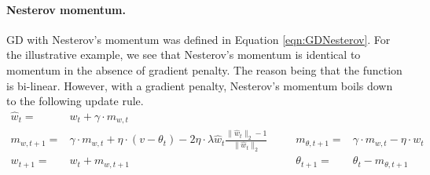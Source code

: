 \paragraph{Nesterov momentum.} GD with Nesterov's momentum was defined in Equation \eqref{eqn:GDNesterov}. For the illustrative example, we see that Nesterov's momentum is identical to momentum in the absence of gradient penalty. The reason being that the function is bi-linear. However, with a gradient penalty, Nesterov's momentum boils down to the following update rule. 
\begin{equation}
\begin{aligned}
\hat{w}_t =& w_t + \gamma\cdot m_{w,t}
~~~~&~~~~ &\\
m_{w, t+1} =& \gamma\cdot m_{w, t} + \eta\cdot (v-\theta_{t}) - 2 \eta\cdot \lambda \hat{w}_t \frac{\|\hat{w}_t\|_2 -1}{\|\hat{w}_t\|_2}
~~~~&~~~~
m_{\theta, t+1} =& \gamma \cdot m_{w, t} - \eta \cdot w_t\\
w_{t+1} =& w_{t} + m_{w, t+1}
~~~~&~~~~
\theta_{t+1} =& \theta_{t} - m_{\theta,t+1}
\end{aligned}
\end{equation}

